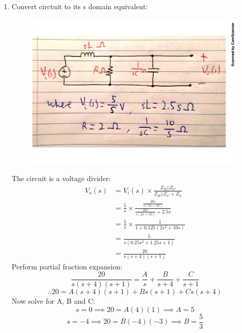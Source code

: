 \begin{enumerate}
	\item{
		Convert circtuit to its s domain equivalent:
		\begin{figure}[H]
			\centering
			\includegraphics[scale=0.55]{q2a.pdf}
		\end{figure}
		The circuit is a voltage divider:
		\begin{align*}
			V_o(s) &= V_i(s) \times \frac{Z_R || Z_C}{Z_R || Z_C + Z_L} \\
			&= \frac{5}{s} \times \frac{\frac{20s}{s(2s+10)}}{\frac{20s}{s(2s+10)}+2.5s} \\
			&= \frac{5}{s} \times \frac{1}{1+0.125(2s^2+10s)} \\
			&= \frac{5}{s(0.25s^2+1.25s+1)} \\
			&= \frac{20}{s(s+4)(s+1)}
		\end{align*}
		Perform partial fraction expansion:
		\begin{equation*}
			\frac{20}{s(s+4)(s+1)} = \frac{A}{s} + \frac{B}{s+4} + \frac{C}{s+1}
		\end{equation*}
		\begin{equation*}
			\therefore 20 = A(s+4)(s+1) + Bs(s+1) + Cs(s+4)
		\end{equation*}
		Now solve for A, B and C:
		\begin{equation*}
			s = 0 \implies 20 = A(4)(1) \implies A = 5
		\end{equation*}
		\begin{equation*}
			s = -4 \implies 20 = B(-4)(-3) \implies B = \frac{5}{3}
		\end{equation*}
		\begin{equation*}

\end{equation*}}
\end{enumerate}
